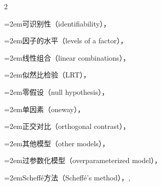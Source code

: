 \begin{multicols}{2}
\par\noindent\hangindent=2em\hspace*{1em}\label{idx:38}可识别性（identifiability），\hyperref[def:11.2.2]{\pageref*{def:11.2.2}}\par
\par\noindent\hangindent=2em\hspace*{1em}\label{idx:39}因子的水平（levels of a factor），\hyperref[idxocc:39:453]{\pageref*{idxocc:39:453}}\par
\par\noindent\hangindent=2em\hspace*{1em}\label{idx:40}线性组合（linear combinations），\hyperref[sec:11.2.3]{\pageref*{sec:11.2.3}}\par
\par\noindent\hangindent=2em\hspace*{1em}\label{idx:41}似然比检验（LRT），\hyperref[exercise:11.13]{\pageref*{exercise:11.13}}\par
\par\noindent\hangindent=2em\hspace*{1em}\label{idx:42}零假设（null hypothesis），\hyperref[eq:11.2.3]{\pageref*{eq:11.2.3}}\par
\par\noindent\hangindent=2em\hspace*{1em}\label{idx:43}单因素（oneway），\hyperref[idxocc:43:452]{\pageref*{idxocc:43:452}}\par
\par\noindent\hangindent=2em\hspace*{1em}\label{idx:44}正交对比（orthogonal contrast），\hyperref[idxocc:44:465]{\pageref*{idxocc:44:465}}\par
\par\noindent\hangindent=2em\hspace*{1em}\label{idx:45}其他模型（other models），\hyperref[sec:11.5.4]{\pageref*{sec:11.5.4}}\par
\par\noindent\hangindent=2em\hspace*{1em}\label{idx:46}过参数化模型（overparameterized model），\hyperref[eq:11.2.2]{\pageref*{eq:11.2.2}}\par
\par\noindent\hangindent=2em\hspace*{1em}\label{idx:47}Scheffé方法（Scheffé’s method），\hyperref[thm:11.2.10]{\pageref*{thm:11.2.10}}, \hyperref[exercise:11.14]{\pageref*{exercise:11.14}}\par

\end{multicols}
